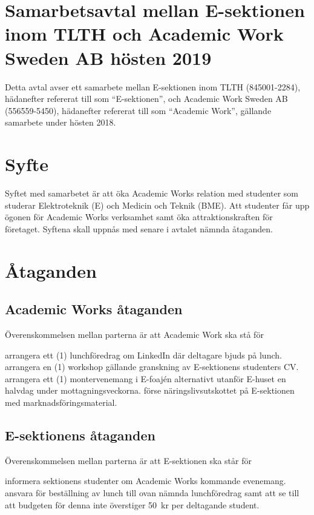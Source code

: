 \documentclass[10pt]{article}
\def\year{2019}
\def\doctitle{Samarbetsavtal mellan E-sektionen inom TLTH och Academic Work Sweden AB hösten {\year}}
\begin{document}
        \section*{\doctitle}
        Detta avtal avser ett samarbete mellan E-sektionen inom TLTH (845001-2284), hädanefter refererat till som “E-sektionen”, och Academic Work Sweden AB (556559-5450), hädanefter refererat till som “Academic Work”, gällande samarbete under hösten 2018.\\
        \section{Syfte}
        Syftet med samarbetet är att öka Academic Works relation med studenter som studerar Elektroteknik (E) och Medicin och Teknik (BME). Att studenter får upp ögonen för Academic Works verksamhet samt öka attraktionskraften för företaget. Syftena skall uppnås med senare i avtalet nämnda åtaganden.
        \section{Åtaganden}
        \subsection{Academic Works åtaganden}
        Överenskommelsen mellan parterna är att Academic Work ska stå för
        \begin{attsatser}
            \att arrangera ett (1) lunchföredrag om LinkedIn där deltagare bjuds på lunch.
            \att arrangera en (1) workshop gällande granskning av E-sektionens studenters CV. 
            \att arrangera ett (1) montervenemang i E-foajén alternativt utanför E-huset en halvdag under mottagningsveckorna. 
            \att förse näringslivsutskottet på E-sektionen med marknadsföringsmaterial. 
        \end{attsatser}

        \subsection{E-sektionens åtaganden}
        Överenskommelsen mellan parterna är att E-sektionen ska står för
        \begin{attsatser}
            \att informera sektionens studenter om Academic Works kommande evenemang. 
            \att ansvara för beställning av lunch till ovan nämnda lunchföredrag samt att se till att budgeten för denna inte överstiger \SI{50}{kr} per deltagande student.         
        \end{attsatser}
        
\end{document}
